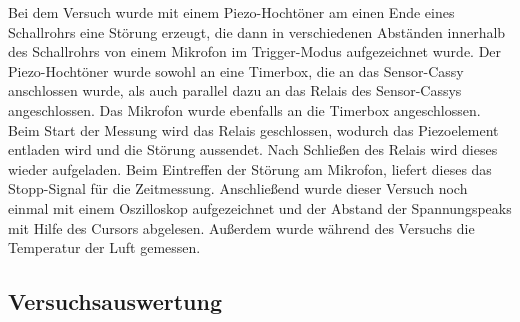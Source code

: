 \documentclass[12pt,a4paper]{article}
\begin{document}
Bei dem Versuch wurde mit einem Piezo-Hochtöner am einen Ende eines Schallrohrs eine Störung erzeugt, die dann in verschiedenen Abständen innerhalb des Schallrohrs von einem Mikrofon im Trigger-Modus aufgezeichnet wurde. Der Piezo-Hochtöner wurde sowohl an eine Timerbox, die an das Sensor-Cassy anschlossen wurde, als auch parallel dazu an das Relais des Sensor-Cassys angeschlossen. Das Mikrofon wurde ebenfalls an die Timerbox angeschlossen. Beim Start der Messung wird das Relais geschlossen, wodurch das Piezoelement entladen wird und die Störung aussendet. Nach Schließen des Relais wird dieses wieder aufgeladen. Beim  Eintreffen der Störung am Mikrofon, liefert dieses das Stopp-Signal für die Zeitmessung.
Anschließend wurde dieser Versuch noch einmal mit einem Oszilloskop aufgezeichnet und der Abstand der Spannungspeaks mit Hilfe des Cursors abgelesen.
Außerdem wurde während des Versuchs die Temperatur der Luft gemessen.
\subsection{Versuchsauswertung}
\end{document}
